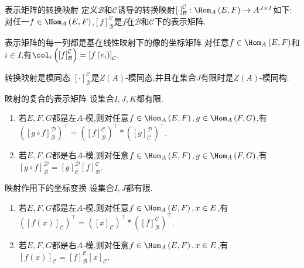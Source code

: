 \begin{definition}{表示矩阵的转换映射}{}
	定义$\mathcal{B}$和$\mathcal{C}$诱导的转换映射$\left[\cdot\right]_{\mathcal{B}}^{\mathcal{C}}:\Hom_{A}\left(E,F\right)\to A^{J\times I}$如下:对任一$f\in\Hom_{A}\left(E,F\right)$,$\left[f\right]_{\mathcal{B}}^{\mathcal{C}}$是$f$在$\mathcal{B}$和$\mathcal{C}$下的表示矩阵.
\end{definition}

\begin{remark}{表示矩阵的每一列都是基在线性映射下的像的坐标矩阵}{}
	对任意$f\in\Hom_{A}\left(E,F\right)$和$i\in I$,有$\col_{i}\left(\left[f\right]_{\mathcal{B}}^{\mathcal{C}}\right)=\left[f\left(e_{i}\right)\right]_{\mathcal{C}}$.
\end{remark}

\begin{proposition}{转换映射是模同态}{}
	$\left[\cdot\right]_{\mathcal{B}}^{\mathcal{C}}$是$Z\left(A\right)$-模同态,并且在集合$J$有限时是$Z\left(A\right)$-模同构.
\end{proposition}

\begin{proposition}{映射的复合的表示矩阵}{}
	设集合$I,J,K$都有限.
	\begin{enumerate}
		\item 若$E,F,G$都是左$A$-模,则对任意$f\in\Hom_{A}\left(E,F\right),g\in\Hom_{A}\left(F,G\right)$,有$\left(\left[g\circ f\right]_{\mathcal{B}}^{\mathcal{D}}\right)^{\top}=\left(\left[f\right]_{\mathcal{B}}^{\mathcal{C}}\right)^{\top}\ast\left(\left[g\right]_{\mathcal{C}}^{\mathcal{D}}\right)^{\top}$.
		\item 若$E,F,G$都是右$A$-模,则对任意$f\in\Hom_{A}\left(E,F\right),g\in\Hom_{A}\left(F,G\right)$,有$\left[g\circ f\right]_{\mathcal{B}}^{\mathcal{D}}=\left[g\right]_{\mathcal{C}}^{\mathcal{D}}\left[f\right]_{\mathcal{B}}^{\mathcal{C}}$.
	\end{enumerate}
\end{proposition}

\begin{corollary}{映射作用下的坐标变换}{}
	设集合$I,J$都有限.
	\begin{enumerate}
		\item 若$E,F,G$都是左$A$-模,则对任意$f\in\Hom_{A}\left(E,F\right),x\in E$,有$\left(\left[f\left(x\right)\right]_{\mathcal{C}}\right)^{\top}=\left(\left[x\right]_{\mathcal{C}}\right)^{\top}\ast\left(\left[f\right]_{\mathcal{B}}^{\mathcal{C}}\right)^{\top}$.
		\item 若$E,F,G$都是右$A$-模,则对任意$f\in\Hom_{A}\left(E,F\right),x\in E$,有$\left[f\left(x\right)\right]_{\mathcal{C}}=\left[f\right]_{\mathcal{B}}^{\mathcal{C}}\left[x\right]_{\mathcal{C}}$.
	\end{enumerate}
\end{corollary}

